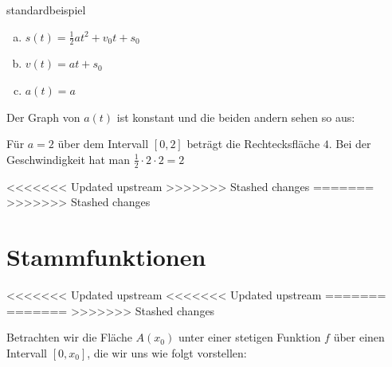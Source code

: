 \documentclass[%
<<<<<<< Updated upstream
<<<<<<< Updated upstream
11pt,%
twoside,%
titlepage,%
german,%
headsepline%
]{scrartcl}
\begin{document}
\begin{lsg}{standardbeispiel}
\begin{enumerate}[a)]
    \item $s(t)=\frac{1}{2}at^2+v_0t+s_0$
    \item $v(t)=at+s_0$
    \item $a(t)=a$
\end{enumerate}
Der Graph von $a(t)$ ist konstant und die beiden andern sehen so aus:
\begin{center}

\end{center}

Für $a=2$ über dem Intervall $[0,2]$ beträgt die Rechtecksfläche $4$. Bei der Geschwindigkeit hat man $\frac{1}{2}\cdot2\cdot2=2$
\end{lsg}
<<<<<<< Updated upstream
>>>>>>> Stashed changes
=======
>>>>>>> Stashed changes

\clearpage

\section{Stammfunktionen}
<<<<<<< Updated upstream
<<<<<<< Updated upstream
=======
=======
>>>>>>> Stashed changes

Betrachten wir die Fläche $A(x_0)$ unter einer stetigen Funktion $f$ über einen Intervall $[0,x_0]$, die wir uns wie folgt vorstellen:
\end{document}
